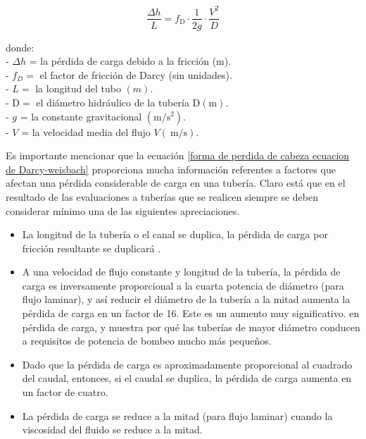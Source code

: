 \begin{equation}
	\frac{\Delta h}{L}=f_{\mathrm{D}} \cdot \frac{1}{2 g} \cdot \frac{V^{2}}{D}
	\label{forma de perdida de cabeza ecuacion de Darcy-weisbach}
\end{equation}

donde:\\

\noindent- $\Delta h$ = la pérdida de carga debido a la fricción (m).\\
- $f_{D}=$ el factor de fricción de Darcy (sin unidades).\\
- $L=$ la longitud del tubo $(m)$.\\
- $\mathrm{D}=$ el diámetro hidráulico de la tubería $\mathrm{D}(\mathrm{m}).$\\
- $g$ = la constante gravitacional $\left(\mathrm{m} / \mathrm{s}^{2}\right).$\\
- $V$ = la velocidad media del flujo $V(\mathrm{~m} / \mathrm{s}).$


Es importante mencionar que la ecuación \ref{forma de perdida de cabeza ecuacion de Darcy-weisbach} proporciona mucha información referentes a factores que afectan una pérdida considerable de carga en una tubería. Claro está que en el resultado de las evaluaciones a tuberías que se realicen  siempre se deben considerar mínimo una de las siguientes apreciaciones.

\begin{itemize}
	\item La longitud de la tubería o el canal se duplica, la pérdida de carga por fricción resultante se duplicará .
	\item A una velocidad de flujo constante y longitud de la tubería, la pérdida de carga es inversamente proporcional a la cuarta potencia de diámetro (para flujo laminar), y así reducir el diámetro de la tubería a la mitad aumenta la pérdida de carga en un factor de 16. Este es un aumento muy significativo. en pérdida de carga, y muestra por qué las tuberías de mayor diámetro conducen a requisitos de potencia de bombeo mucho más pequeños.
	\item Dado que la pérdida de carga es aproximadamente proporcional al cuadrado del caudal, entonces, si el caudal se duplica, la pérdida de carga aumenta en un factor de cuatro.
	\item La pérdida de carga se reduce a la mitad (para flujo laminar) cuando la viscosidad del fluido se reduce a la mitad.
\end{itemize}

